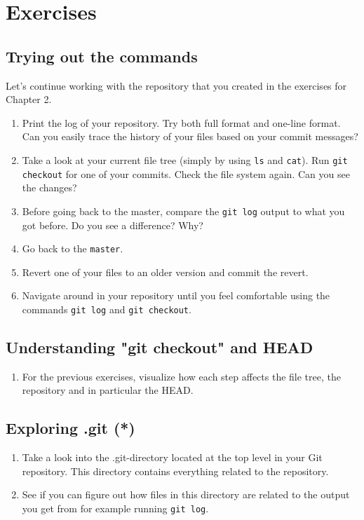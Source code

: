 \documentclass[../main/git_course_main.tex]{subfiles}
\begin{document}
\newpage
\section{Exercises}

\subsection{Trying out the commands}

Let's continue working with the repository that you created in the exercises for Chapter 2.

\begin{enumerate}
	\item Print the log of your repository. Try both full format and one-line format. Can you easily trace the history of your files based on your commit messages?
	\item Take a look at your current file tree (simply by using \verb$ls$ and \verb$cat$). Run \verb$git checkout$ for one of your commits. Check the file system again. Can you see the changes?
	\item Before going back to the master, compare the \verb$git log$ output to what you got before. Do you see a difference? Why?
	\item Go back to the \verb$master$.
	\item Revert one of your files to an older version and commit the revert.
	\item Navigate around in your repository until you feel comfortable using the commands \verb$git log$ and \verb$git checkout$.
\end{enumerate}

\subsection{Understanding "git checkout" and HEAD}

\begin{enumerate}
	\item For the previous exercises, visualize how each step affects the file tree, the repository and in particular the HEAD.
\end{enumerate}

\subsection{Exploring .git (*)}

\begin{enumerate}
	\item Take a look into the .git-directory located at the top level in your Git repository. This directory contains everything related to the repository.
	\item See if you can figure out how files in this directory are related to the output you get from for example running \verb$git log$.
\end{enumerate}
\end{document}
